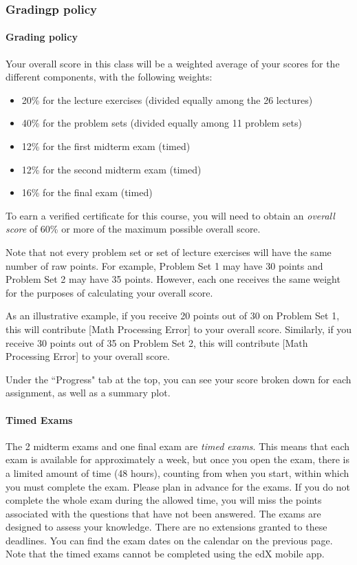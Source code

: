 \documentclass[pdftex, brazil, 12pt, twoside]{article}
\begin{document}
\subsubsection{Gradingp policy}
\label{ovw0-sy-grades}

\paragraph{Grading policy} Your overall score in this class will be a weighted
average of your scores for the different components, with the following weights:

\begin{itemize}[noitemsep]
\item 20\% for the lecture exercises (divided equally among the 26 lectures)
\item 40\% for the problem sets (divided equally among 11 problem sets)
\item 12\% for the first midterm exam (timed)
\item 12\% for the second midterm exam (timed)
\item 16\% for the final exam (timed)
\end{itemize}

To earn a verified certificate for this course, you will need to obtain an
\emph{overall score} of 60\% or more of the maximum possible overall score.

Note that not every problem set or set of lecture exercises will have the same
number of raw points. For example, Problem Set 1 may have 30 points and Problem
Set 2 may have 35 points. However, each one receives the same weight for the
purposes of calculating your overall score.

As an illustrative example, if you receive 20 points out of 30 on Problem Set 1,
this will contribute [Math Processing Error] to your overall score. Similarly, if
you receive 30 points out of 35 on Problem Set 2, this will contribute
[Math Processing Error] to your overall score.

Under the “Progress" tab at the top, you can see your score broken down for each
assignment, as well as a summary plot.

\paragraph{Timed Exams} The 2 midterm exams and one final exam are \emph{timed exams}.
This means that each exam is available for approximately a week, but once you open
the exam, there is a limited amount of time (48 hours), counting from when you start,
within which you must complete the exam. Please plan in advance for the exams. If you
do not complete the whole exam during the allowed time, you will miss the points
associated with the questions that have not been answered. The exams are designed
to assess your knowledge. There are no extensions granted to these deadlines.
You can find the exam dates on the calendar on the previous page. Note that the
timed exams cannot be completed using the edX mobile app.
\end{document}
